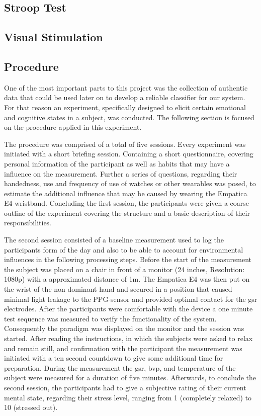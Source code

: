 \subsection{Stroop Test}
\subsection{Visual Stimulation}
\subsection{Procedure}
One of the most important parts to this project was the collection of authentic data that could be used later on to develop a reliable classifier for our system. For that reason an experiment, specifically designed to elicit certain emotional and cognitive states in a subject, was conducted. The following section is focused on the procedure applied in this experiment.

The procedure was comprised of a total of five sessions. Every experiment was initiated with a short briefing session. Containing a short questionnaire, covering personal information of the participant as well as habits that may have a influence on the measurement. Further a series of questions, regarding their handedness, use and frequency of use of watches or other wearables was posed, to estimate the additional influence that may be caused by wearing the Empatica E4 wristband.
Concluding the first session, the participants were given a coarse outline of the experiment covering the structure and a basic description of their responsibilities.

The second session consisted of a baseline measurement used to log the participants form of the day and also to be able to account for environmental influences in the following processing steps. Before the start of the measurement the subject was placed on a chair in front of a monitor (24 inches, Resolution: 1080p) with a approximated distance of 1m. The Empatica E4 was then put on the wrist of the non-dominant hand and secured in a position that caused minimal light leakage to the PPG-sensor and provided optimal contact for the \gls{gsr} electrodes. After the participants were comfortable with the device a one minute test sequence was measured to verify the functionality of the system.
Consequently the paradigm was displayed on the monitor and the session was started. After reading the instructions, in which the subjects were asked to relax and remain still, and confirmation with the participant the measurement was initiated with a ten second countdown to give some additional time for preparation.
During the measurement the \gls{gsr}, \gls{bvp}, and temperature of the subject were measured for a duration of five minutes.
Afterwards, to conclude the second session, the participants had to give a subjective rating of their current mental state, regarding their stress level, ranging from 1 (completely relaxed) to 10 (stressed out).

